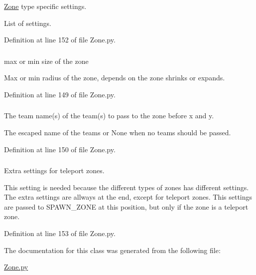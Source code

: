 \hyperlink{class_zone_1_1_zone}{Zone} type specific settings. 

List of settings. 

Definition at line 152 of file Zone.py.

\hypertarget{class_zone_1_1_zone_a9962b673a138b53b1631158d18cf5279}{
\subsubsection[{target\_\-size}]{}}
\label{class_zone_1_1_zone_a9962b673a138b53b1631158d18cf5279}


max or min size of the zone 

Max or min radius of the zone, depends on the zone shrinks or expands. 

Definition at line 149 of file Zone.py.

\hypertarget{class_zone_1_1_zone_a0f3f8429ae8a37672f700da3f2805a91}{
\subsubsection[{teamnames}]{}}
\label{class_zone_1_1_zone_a0f3f8429ae8a37672f700da3f2805a91}


The team name(s) of the team(s) to pass to the zone before x and y. 

The escaped name of the teams or None when no teams should be passed. 

Definition at line 150 of file Zone.py.

\hypertarget{class_zone_1_1_zone_a2b9ae272876347626e25ead4d48f9a97}{
\subsubsection[{teleport\_\-settings}]{}}
\label{class_zone_1_1_zone_a2b9ae272876347626e25ead4d48f9a97}


Extra settings for teleport zones. 

This setting is needed because the different types of zones has different settings. The extra settings are allways at the end, except for teleport zones. This settings are passed to SPAWN\_\-ZONE at this position, but only if the zone is a teleport zone. 

Definition at line 153 of file Zone.py.



The documentation for this class was generated from the following file:\begin{DoxyCompactItemize}
\item 
\hyperlink{_zone_8py}{Zone.py}\end{DoxyCompactItemize}
